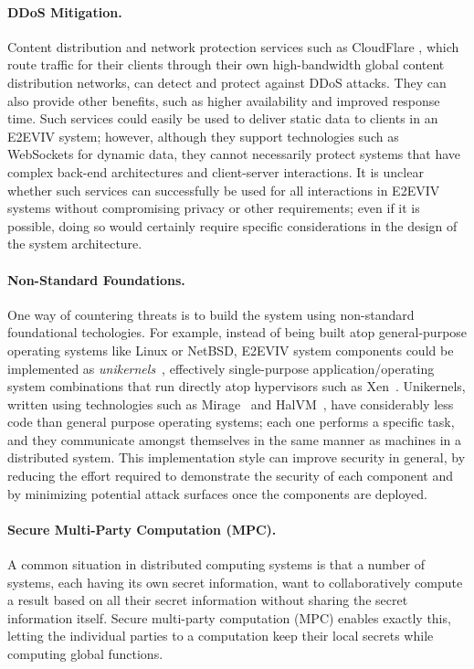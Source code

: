 \paragraph{DDoS Mitigation.} Content distribution and network
protection services such as CloudFlare \cite{CloudFlare}, which route
traffic for their clients through their own high-bandwidth global
content distribution networks, can detect and protect against DDoS
attacks. They can also provide other benefits, such as higher
availability and improved response time. Such services could easily be
used to deliver static data to clients in an E2EVIV system; however,
although they support technologies such as WebSockets for dynamic
data, they cannot necessarily protect systems that have complex
back-end architectures and client-server interactions. It is unclear
whether such services can successfully be used for all interactions in
E2EVIV systems without compromising privacy or other requirements;
even if it is possible, doing so would certainly require specific
considerations in the design of the system architecture.

\paragraph{Non-Standard Foundations.} One way of countering threats is
to build the system using non-standard foundational techologies. For
example, instead of being built atop general-purpose operating systems
like Linux or NetBSD, E2EVIV system components could be implemented as
\emph{unikernels}~\cite{Madhavapeddy13}, effectively single-purpose
application/operating system combinations that run directly atop
hypervisors such as Xen~\cite{Xen}. Unikernels, written using
technologies such as Mirage~\cite{OpenMirage} and HalVM~\cite{HalVM},
have considerably less code than general purpose operating systems;
each one performs a specific task, and they communicate amongst
themselves in the same manner as machines in a distributed
system. This implementation style can improve security in general, by
reducing the effort required to demonstrate the security of each
component and by minimizing potential attack surfaces once the
components are deployed.

\paragraph{Secure Multi-Party Computation (MPC).} A common situation
in distributed computing systems is that a number of systems, each
having its own secret information, want to collaboratively compute a
result based on all their secret information without sharing the
secret information itself. Secure multi-party computation (MPC)
enables exactly this, letting the individual parties to a computation
keep their local secrets while computing global
functions. 

